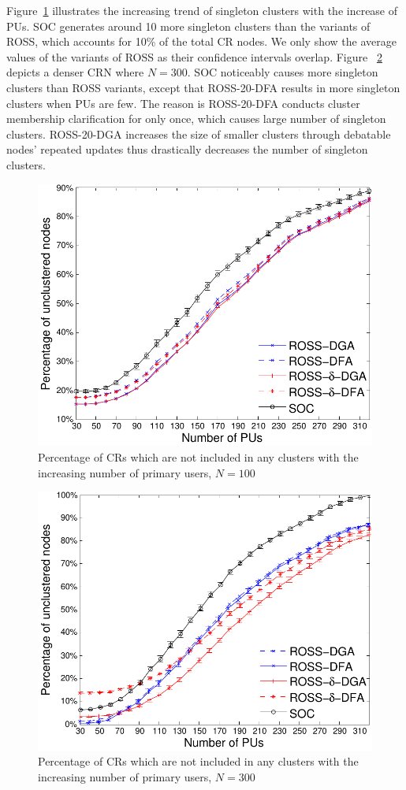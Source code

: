 \documentclass[10pt,journal,compsoc]{IEEEtran}
\theoremstyle{mytheoremstyle}
\theoremstyle{mytheoremstyle}
\theoremstyle{mytheoremstyle}
\begin{document}
Figure~\ref{singleton_clusters_100} illustrates the increasing trend of singleton clusters with the increase of PUs.
SOC generates around 10 more singleton clusters than the variants of ROSS, which accounts for 10\% of the total CR nodes.
We only show the average values of the variants of ROSS as their confidence intervals overlap.
%
Figure ~\ref{singleton_clusters_300} depicts a denser CRN where $N=300$.
SOC noticeably causes more singleton clusters than ROSS variants, except that ROSS-20-DFA results in more singleton clusters when PUs are few.
The reason is ROSS-20-DFA conducts cluster membership clarification for only once, which causes large number of singleton clusters.
ROSS-20-DGA increases the size of smaller clusters through debatable nodes' repeated updates thus drastically decreases the number of singleton clusters.

\begin{figure}[!h]
  \centering
  \includegraphics[width=0.8\linewidth]{survival_rate_100.pdf}
  \caption{Percentage of CRs which are not included in any clusters with the increasing number of primary users, $N=100$}
  \label{singleton_clusters_100}
\end{figure}
  
  \begin{figure}[!h]
    \centering
   \includegraphics[width=0.8\linewidth]{survival_rate_300.pdf}
  \caption{Percentage of CRs which are not included in any clusters with the increasing number of primary users, $N=300$}
  \label{singleton_clusters_300}
\end{figure}
\end{document}
